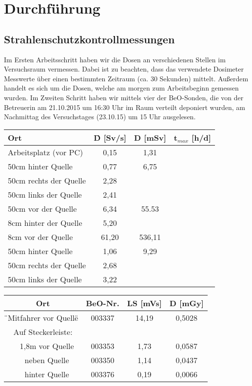 \section{Durchführung}
\subsection{Strahlenschutzkontrollmessungen}
Im Ersten Arbeitsschritt haben wir die Dosen an verschiedenen Stellen im Versuchsraum vermessen. Dabei ist zu beachten, dass das verwendete Dosimeter Messwerte über einen bestimmten Zeitraum (ca. 30 Sekunden) mittelt. Außerdem handelt es sich um die Dosen, welche am morgen zum Arbeitsbeginn gemessen wurden. %
Im Zweiten Schritt haben wir mittels vier der BeO-Sonden, die von der Betreuerin am 21.10.2015 um 16:30 Uhr im Raum verteilt deponiert wurden, am Nachmittag des Versuchstages (23.10.15) um 15 Uhr ausgelesen.  %

	\begin{center}	

					\begin{tabular}{l|c|c|c}
								\textbf{Ort} & \textbf{\.D} [Sv/s] & \textbf{D} [mSv]  & \textbf{t$_{max}$} [h/d]\\ 
						\hline  Arbeitsplatz (vor PC) & 0,15  & 1,31   & \\ 
								50cm hinter Quelle    & 0,77  & 6,75   & \\ 
								50cm rechts der Quelle& 2,28  &        &\\ 
								50cm links der Quelle & 2,41  &        &\\ 
								50cm vor der Quelle   & 6,34  & 55.53  & \\ 
								8cm hinter der Quelle & 5,20  &        &\\ 
								8cm vor der Quelle    & 61,20 & 536,11 & \\
						\hline  50cm hinter Quelle    & 1,06  & 9,29   & \\
								50cm rechts der Quelle& 2,68  &        &\\ 
								50cm links der Quelle & 3,22  &        &\\
					\end{tabular}	
	
					\begin{tabular}{c|c|c|c}
								\textbf{Ort} & \textbf{BeO-Nr.} & \textbf{LS} [mVs] & \textbf{D} [mGy] \\
						\hline  \"{}Mitfahrer vor Quelle\" & 003337 & 14,19 & 0,5028 \\
								Auf Steckerleiste:         &        &       &        \\
								 \ \ 1,8m vor Quelle       & 003353 & 1,73  & 0,0587 \\
								 \ \ neben Quelle          & 003350 & 1,14  & 0,0437 \\
								 \ \ hinter Quelle         & 003376 & 0,19  & 0,0066 \\
						
					\end{tabular}
	\end{center}
	
